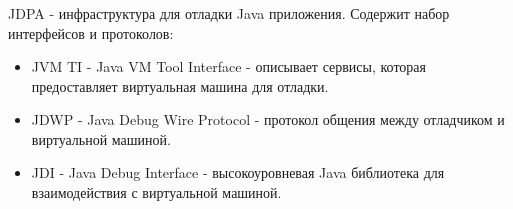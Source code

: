 \begin{frame}
\frametitle{\insertsection} 
\framesubtitle{\insertsubsection}
JDPA - инфраструктура для отладки Java приложения. Содержит набор интерфейсов и протоколов:
\begin{itemize}
	\item JVM TI - Java VM Tool Interface - описывает сервисы, которая предоставляет виртуальная машина для отладки.
	\item JDWP - Java Debug Wire Protocol - протокол общения между отладчиком и виртуальной машиной. 
	\item JDI - Java Debug Interface - высокоуровневая Java библиотека для взаимодействия с виртуальной машиной.
\end{itemize}
\end{frame}
